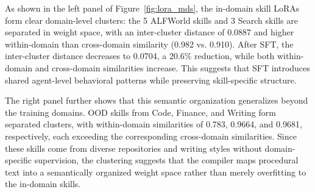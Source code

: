 \documentclass{llmxive}
\begin{document}
As shown in the left panel of Figure~\ref{fig:lora_mds}, the in-domain skill LoRAs form clear domain-level clusters: the 5 ALFWorld skills and 3 Search skills are separated in weight space, with an inter-cluster distance of 0.0887 and higher within-domain than cross-domain similarity (0.982 vs. 0.910). After SFT, the inter-cluster distance decreases to 0.0704, a 20.6\% reduction, while both within-domain and cross-domain similarities increase. This suggests that SFT introduces shared agent-level behavioral patterns while preserving skill-specific structure.

The right panel further shows that this semantic organization generalizes beyond the training domains. OOD skills from Code, Finance, and Writing form separated clusters, with within-domain similarities of 0.783, 0.9664, and 0.9681, respectively, each exceeding the corresponding cross-domain similarities. Since these skills come from diverse repositories and writing styles without domain-specific supervision, the clustering suggests that the compiler maps procedural text into a semantically organized weight space rather than merely overfitting to the in-domain skills.
\end{document}
